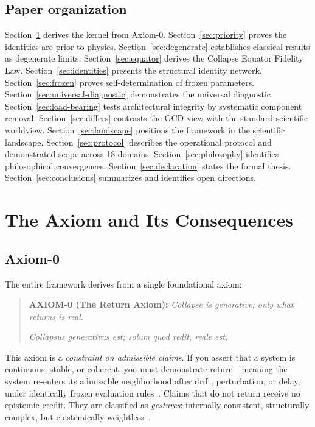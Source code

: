 \documentclass[
  aps,
  prd,
  twocolumn,
  superscriptaddress,
  nofootinbib,
  floatfix
]{revtex4-2}
\begin{document}
\subsection{Paper organization}

Section~\ref{sec:axiom} derives the kernel from Axiom-0.
Section~\ref{sec:priority} proves the identities are prior to
physics.  Section~\ref{sec:degenerate} establishes classical results
as degenerate limits.  Section~\ref{sec:equator} derives the Collapse
Equator Fidelity Law.  Section~\ref{sec:identities} presents the
structural identity network.  Section~\ref{sec:frozen} proves
self-determination of frozen parameters.
Section~\ref{sec:universal-diagnostic} demonstrates the universal
diagnostic.  Section~\ref{sec:load-bearing} tests architectural
integrity by systematic component removal.
Section~\ref{sec:differs} contrasts the GCD view with the standard
scientific worldview.  Section~\ref{sec:landscape} positions the
framework in the scientific landscape.
Section~\ref{sec:protocol} describes the operational protocol and
demonstrated scope across 18 domains.
Section~\ref{sec:philosophy} identifies philosophical convergences.
Section~\ref{sec:declaration} states the formal thesis.
Section~\ref{sec:conclusions} summarizes and identifies open
directions.

\section{The Axiom and Its Consequences}\label{sec:axiom}

\subsection{Axiom-0}

The entire framework derives from a single foundational axiom:

\begin{quote}
\textbf{AXIOM-0 (The Return Axiom):} \emph{Collapse is generative;
only what returns is real.}

\emph{Collapsus generativus est; solum quod redit, reale est.}
\end{quote}

This axiom is a \emph{constraint on admissible claims}.  If you assert
that a system is continuous, stable, or coherent, you must demonstrate
return---meaning the system re-enters its admissible neighborhood
after drift, perturbation, or delay, under identically frozen
evaluation rules~\cite{paulus2025episteme}.  Claims that do not return
receive no epistemic credit.  They are classified as \emph{gestures}:
internally consistent, structurally complex, but epistemically
weightless~\cite{paulus2025seamreality}.
\end{document}
